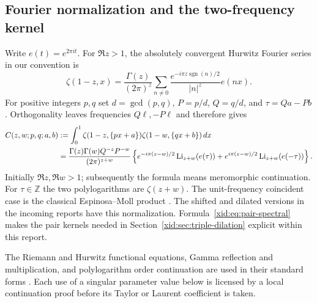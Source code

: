 \subsection{Fourier normalization and the two-frequency kernel}

Write $e(t)=e^{2\pi it}$. For $\Re z>1$, the absolutely convergent
Hurwitz Fourier series in our convention is
\begin{equation}\label{xid:eq:Hurwitz-Fourier}
 \zeta(1-z,x)=\frac{\Gamma(z)}{(2\pi)^z}
 \sum_{n\ne0}\frac{e^{-i\pi z\operatorname{sgn}(n)/2}}{|n|^z}e(nx).
\end{equation}
For positive integers $p,q$ set $d=\gcd(p,q)$,
$P=p/d$, $Q=q/d$, and $\tau=Qa-Pb$. Orthogonality leaves
frequencies $Q\ell,-P\ell$ and therefore gives
\begin{align}
 C(z,w;p,q;a,b)
 &: =\int_0^1\zeta(1-z,\{px+a\})
                  \zeta(1-w,\{qx+b\})\,dx\notag\\
 &=\frac{\Gamma(z)\Gamma(w)Q^{-z}P^{-w}}{(2\pi)^{z+w}}
 \left\{e^{-i\pi(z-w)/2}\operatorname{Li}_{z+w}(e(\tau))
       +e^{i\pi(z-w)/2}\operatorname{Li}_{z+w}(e(-\tau))\right\}.
 \label{xid:eq:pair-spectral}
\end{align}
Initially $\Re z,\Re w>1$; subsequently the formula means
meromorphic continuation. For $\tau\in\mathbb Z$ the two
polylogarithms are $\zeta(z+w)$. The unit-frequency coincident case
is the classical Espinosa--Moll product \cite[Theorem 3.1]{EspinosaMoll1}.
The shifted and dilated versions in the incoming reports have this
normalization. Formula~\eqref{xid:eq:pair-spectral} makes the pair kernels
needed in Section~\ref{xid:sec:triple-dilation} explicit within this report.

The Riemann and Hurwitz functional equations, Gamma reflection and
multiplication, and polylogarithm order continuation are used in their
standard forms \cite{DLMFhurwitz,wat:DLMF}. Each use of a singular
parameter value below is licensed by a local continuation proof before
its Taylor or Laurent coefficient is taken.
